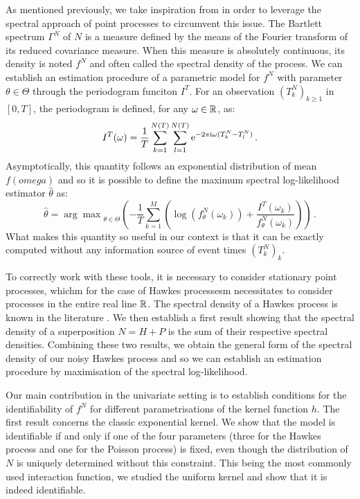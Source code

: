     As mentioned previously, we take inspiration from \textcite{Cheysson2022} in order to leverage the spectral approach of point processes to circumvent this issue. 
    The Bartlett spectrum $\Gamma^N$ of $N$ is a measure defined by the means of the Fourier transform of its reduced covariance measure.
    When this measure is absolutely continuous, its density is noted $f^N$ and often called the spectral density of the process.
    We can establish an estimation procedure of a parametric model for $f^N$ with parameter $\theta\in\Theta$ through the periodogram funciton $I^T$.
    For an observation $(T_k^N)_{k\geq 1}$ in $[0,T]$, the periodogram is defined, for any $\omega\in{\mathbb R}$, as:
    \begin{equation}\label{eq:chap0_periodogram}
      I^T(\omega) = \frac{1}{T}\sum_{k=1}^{N(T)}\sum_{l=1}^{N(T)}{\mathrm{e}^{-2\pi \mathrm{i} \omega (T_k^N - T_l^N)}}\,.
    \end{equation}
    Asymptotically, this quantity follows an exponential distribution of mean $f(omega)$ and so it is possible to define the maximum spectral log-likelihood estimator $\hat \theta$ as:
    \begin{equation}\label{eq:chap0_spectral_estimator}
      \hat \theta = {\arg\max}_{\theta\in\Theta} \left(-\frac{1}{T}\sum_{k=1}^{M}{\left(\log\left(f_\theta^N(\omega_k)\right) + \frac{I^T(\omega_k)}{f_\theta^N(\omega_k)}\right)}\right)\,.
    \end{equation}
    What makes this quantity so useful in our context is that it can be exactly computed without any information source of event times $(T_k^N)_k$. 

    To correctly work with these tools, it is necessary to consider stationary point processes,
    whichm for the case of Hawkes processesm necessitates to consider processes in the entire real line ${\mathbb R}$.
    The spectral density of a Hawkes process is known in the literature \parencite[Example 8.2(e)]{DaleyV1}.
    We then establish a first result showing that the spectral density of a superposition $N = H + P$ is the sum of their respective spectral densities.
    Combining these two results, we obtain the general form of the spectral density of our noisy Hawkes process and so we can establish an estimation procedure by maximisation of the spectral log-likelihood.
    
    Our main contribution in the univariate setting is to establish conditions for the identifiability of $f^N$ for different parametrisations of the kernel function $h$. 
    The first result concerns the classic exponential kernel. 
    We show that the model is identifiable if and only if one of the four parameters (three for the Hawkes process and one for the Poisson process) is fixed, even though the distribution of $N$ is uniquely determined without this constraint.
    This being the most commonly used interaction function, we studied the uniform kernel and show that it is indeed identifiable.

